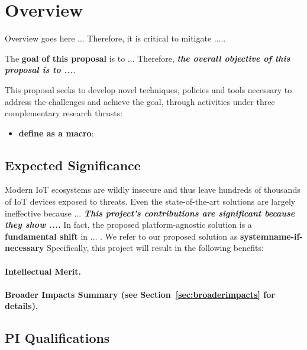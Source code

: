 
\section{Overview}
\label{sec:overview}

Overview goes here ... Therefore, 
it is critical
to mitigate .....


The \textbf{goal of this proposal} is to
...
Therefore, 
\textbf{\em the overall objective of this proposal is to ...}.


	

This proposal seeks to develop novel
techniques, policies and tools necessary to address the challenges and achieve the goal,
through activities %
under three complementary research thrusts: 
\begin{itemize}[leftmargin=*]
	\item 
	\textbf{define as a macro}: 
		
\end{itemize}

\subsection{Expected Significance}
\label{sec:expected-significance}

Modern IoT ecosystems are wildly insecure and thus 
leave hundreds of thousands of IoT devices exposed to threats. %
Even the state-of-the-art solutions 
are largely ineffective because ... 
\textbf{\em This project's contributions are significant because
	they show .... }
	In fact, the proposed platform-agnostic solution is a \textbf{fundamental shift} 
	in ... .	
	We refer to our proposed solution as
        \textbf{systemname-if-necessary}	
        Specifically, this project will result in the following benefits:




\paragraph{Intellectual Merit.} 


\paragraph{Broader Impacts Summary (see Section~\ref{sec:broaderimpacts} for details).} 





\subsection{PI Qualifications}


